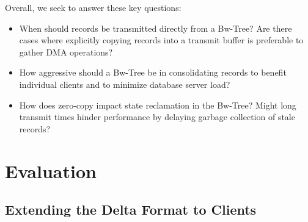 Overall, we seek to answer these key questions:
\begin{itemize}
\item
When should records be transmitted directly from a Bw-Tree? Are there cases
where explicitly copying records into a transmit buffer is preferable to gather
DMA operations?
\item
How aggressive should a Bw-Tree be in consolidating records to benefit individual
clients and to minimize database server load?
\item
How does zero-copy impact state reclamation in the Bw-Tree? Might long transmit
times hinder performance by delaying garbage collection of stale records?
\end{itemize}














\section{Evaluation}

\subsection{Extending the Delta Format to Clients}


